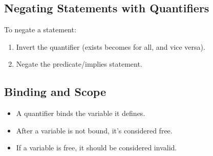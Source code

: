 \subsection{Negating Statements with Quantifiers}
To negate a statement:
\begin{enumerate}
    \item Invert the quantifier (exists becomes for all, and vice versa).
    \item Negate the predicate/implies statement.
\end{enumerate}
\subsection{Binding and Scope}
\begin{itemize}
    \item A quantifier binds the variable it defines.
    \item After a variable is not bound, it's considered free.
    \item If a variable is free, it should be considered invalid.
\end{itemize}